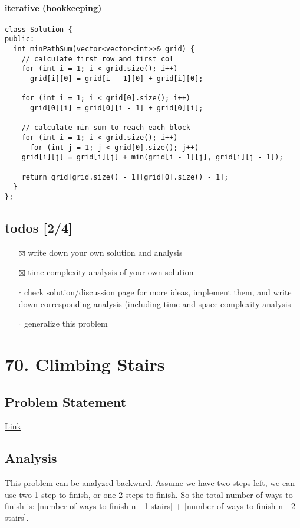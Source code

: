 \documentclass[11pt]{article}
\begin{document}
\paragraph{iterative (bookkeeping)}
\label{sec:orga3a3fe2}
\begin{verbatim}
class Solution {
public:
  int minPathSum(vector<vector<int>>& grid) {
    // calculate first row and first col 
    for (int i = 1; i < grid.size(); i++)
      grid[i][0] = grid[i - 1][0] + grid[i][0];

    for (int i = 1; i < grid[0].size(); i++)
      grid[0][i] = grid[0][i - 1] + grid[0][i];

    // calculate min sum to reach each block
    for (int i = 1; i < grid.size(); i++)
      for (int j = 1; j < grid[0].size(); j++)
	grid[i][j] = grid[i][j] + min(grid[i - 1][j], grid[i][j - 1]);

    return grid[grid.size() - 1][grid[0].size() - 1];
  }
};
\end{verbatim}
\subsection{todos [2/4]}
\label{sec:org3db43f0}
\begin{itemize}
\item[{$\boxtimes$}] write down your own solution and analysis
\item[{$\boxtimes$}] time complexity analysis of your own solution
\item[{$\square$}] check solution/discussion page for more ideas, implement them, and write down corresponding analysis (including time and space complexity analysis
\item[{$\square$}] generalize this problem
\end{itemize}
\section{70. Climbing Stairs}
\label{sec:orgf0e1fcb}
\subsection{Problem Statement}
\label{sec:orgcb86bd2}
\href{https://leetcode.com/problems/climbing-stairs/}{Link}
\subsection{Analysis}
\label{sec:orgd7861b0}
This problem can be analyzed backward. Assume we have two steps left, we can use two 1 step to finish, or one 2 steps to finish. So the total number of ways to finish is: [number of ways to finish n - 1 stairs] + [number of ways to finish n - 2 stairs].
\end{document}
